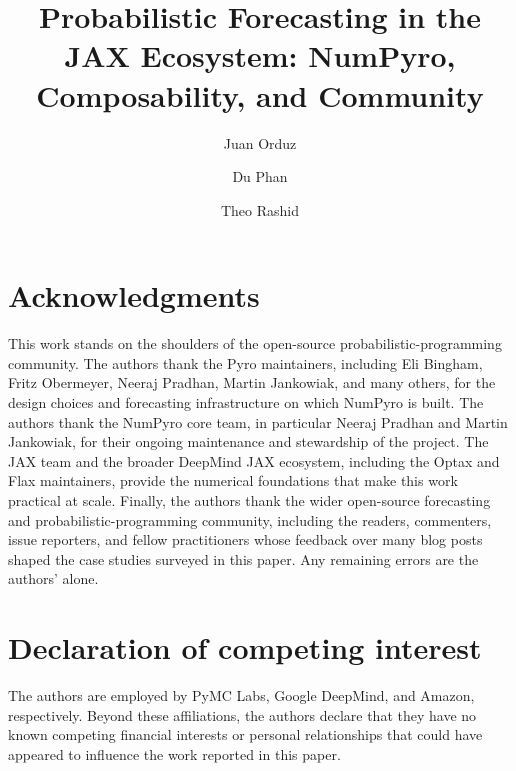 \documentclass[11pt,3p,authoryear]{elsarticle}
\begin{document}
\begin{frontmatter}

\title{Probabilistic Forecasting in the JAX Ecosystem:
NumPyro, Composability, and Community}

\author[jo]{Juan Orduz}
\author[gdm]{Du Phan}
\author[amzn]{Theo Rashid}

\address[jo]{PyMC Labs, [Germany]}
\address[gdm]{[United States]}
\address[amzn]{Amazon, [United States]}


\end{frontmatter}

\section*{Acknowledgments}

This work stands on the shoulders of the open-source probabilistic-programming community. The authors thank the Pyro maintainers, including Eli Bingham, Fritz Obermeyer, Neeraj Pradhan, Martin Jankowiak, and many others, for the design choices and forecasting infrastructure on which NumPyro is built. The authors thank the NumPyro core team, in particular Neeraj Pradhan and Martin Jankowiak, for their ongoing maintenance and stewardship of the project. The JAX team and the broader DeepMind JAX ecosystem, including the Optax and Flax maintainers, provide the numerical foundations that make this work practical at scale. Finally, the authors thank the wider open-source forecasting and probabilistic-programming community, including the readers, commenters, issue reporters, and fellow practitioners whose feedback over many blog posts shaped the case studies surveyed in this paper. Any remaining errors are the authors' alone.

\section*{Declaration of competing interest}

The authors are employed by PyMC Labs, Google DeepMind, and Amazon, respectively. Beyond these affiliations, the authors declare that they have no known competing financial interests or personal relationships that could have appeared to influence the work reported in this paper. 
\end{document}
